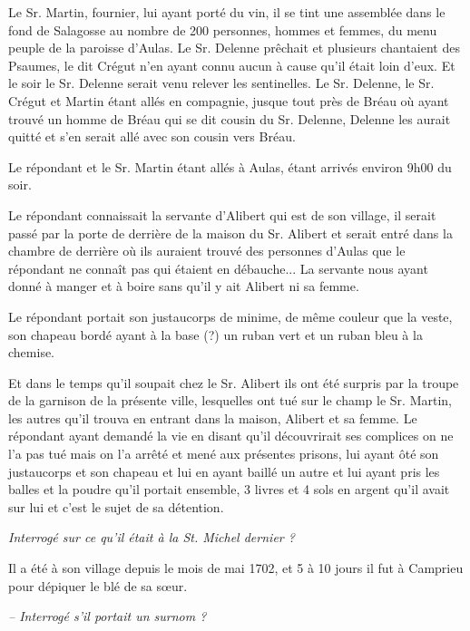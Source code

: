 Le Sr. Martin, fournier, lui ayant porté du vin, il se tint une assemblée dans le fond de Salagosse au nombre de 200 personnes, hommes et femmes, du menu peuple de la paroisse d’Aulas. Le Sr. Delenne prêchait et plusieurs chantaient des Psaumes, le dit Crégut n’en ayant connu aucun à cause qu’il était loin d’eux.
Et le soir le Sr. Delenne serait venu relever les sentinelles. Le Sr. Delenne, le Sr. Crégut et Martin étant allés en compagnie, jusque tout près de Bréau où ayant trouvé un homme de Bréau qui se dit cousin du Sr. Delenne, Delenne les aurait quitté et s’en serait allé avec son cousin vers Bréau.

Le répondant et le Sr. Martin étant allés à Aulas, étant arrivés environ 9h00 du soir.

Le répondant connaissait la servante d’Alibert qui est de son village, il serait passé par la porte de derrière de la maison du Sr. Alibert et serait entré dans la chambre de derrière où ils auraient trouvé des personnes d’Aulas que le répondant ne connaît pas qui étaient en débauche... La servante nous ayant donné à manger et à boire sans qu’il y ait Alibert ni sa femme.

Le répondant portait son justaucorps de minime, de même couleur que la veste, son chapeau bordé ayant à la base (?) un ruban vert et un ruban bleu à la chemise.

Et dans le temps qu’il soupait chez le Sr. Alibert ils ont été surpris par la troupe de la garnison de la présente ville, lesquelles ont tué sur le champ le Sr. Martin, les autres qu’il trouva en entrant dans la maison, Alibert et sa femme. Le répondant ayant demandé la vie en disant qu’il découvrirait ses complices on ne l’a pas tué mais on l’a arrêté et mené aux présentes prisons, lui ayant ôté son justaucorps et son chapeau et lui en ayant baillé un autre et lui ayant pris les balles et la poudre qu’il portait ensemble, 3 livres et 4 sols en argent qu’il avait sur lui et c’est le sujet de sa détention.

\vspace{0.35em}

\textit{Interrogé sur ce qu’il était à la St. Michel dernier ?}

Il a été à son village depuis le mois de mai 1702, et 5 à 10 jours il fut à Camprieu pour dépiquer le blé de sa sœur.

\vspace{0.2em}

\hspace{5mm}\textit{-- Interrogé s’il portait un surnom ?}

